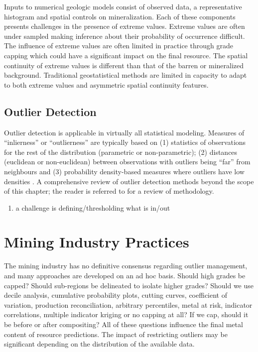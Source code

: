 Inputs to numerical geologic models consist of observed data, a representative histogram and spatial controls on mineralization. Each of these components presents challenges in the presence of extreme values. Extreme values are often under sampled making inference about their probability of occurrence difficult. The influence of extreme values are often limited in practice through grade capping which could have a significant impact on the final resource. The spatial continuity of extreme values is different than that of the barren or mineralized background. Traditional geostatistical methods are limited in capacity to adapt to both extreme values and asymmetric spatial continuity features.

\FloatBarrier
\subsection{Outlier Detection}
\label{subsec:02dectection}

Outlier detection is applicable in virtually all statistical modeling. Measures of ``inlierness'' or ``outlierness'' are typically based on (1) statistics of observations for the rest of the distribution (parametric or non-parametric); (2) distances (euclidean or non-euclidean) between observations with outliers being ``far'' from neighbours and (3) probability density-based measures where outliers have low densities \citep{li2022ecod}. A comprehensive review of outlier detection methods beyond the scope of this chapter; the reader is referred to \cite{aggarwal2016outlier,pang2022deep,hodge2004survey,wang2019progress} for a review of methodology.

\begin{enumerate}
    \item a challenge is defining/thresholding what is in/out
\end{enumerate}



\FloatBarrier
\section{Mining Industry Practices}
\label{sec:02industry}

The mining industry has no definitive consensus regarding outlier management, and many approaches are developed on an ad hoc basis. Should high grades be capped? Should sub-regions be delineated to isolate higher grades? Should we use decile analysis, cumulative probability plots, cutting curves, coefficient of variation, production reconciliation, arbitrary percentiles, metal at risk, indicator correlations, multiple indicator kriging or no capping at all? If we cap, should it be before or after compositing? All of these questions influence the final metal content of resource predictions. The impact of restricting outliers may be significant depending on the distribution of the available data.

